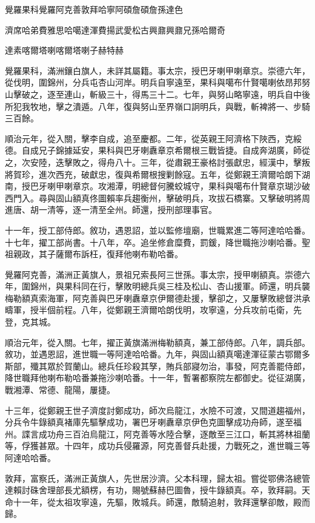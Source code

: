 
\begin{pinyinscope}
覺羅果科覺羅阿克善敦拜哈寧阿碩詹碩詹孫達色

濟席哈弟費雅思哈噶達渾費揚武愛松古興鼐興鼐兄孫哈爾奇

達素喀爾塔喇喀爾塔喇子赫特赫

覺羅果科，滿洲鑲白旗人，未詳其屬籍。事太宗，授巴牙喇甲喇章京。崇德六年，從伐明，圍錦州，分兵屯杏山河岸。明兵自寧遠至，果科與噶布什賢噶喇依昂邦努山擊破之，逐至連山，斬級三十，得馬三十二。七年，與努山略寧遠，明兵自中後所犯我牧地，擊之潰遁。八年，復與努山至界嶺口詗明兵，與戰，斬裨將一、步騎三百餘。

順治元年，從入關，擊李自成，追至慶都。二年，從英親王阿濟格下陜西，克綏德。自成兄子錦據延安，果科與巴牙喇纛章京希爾根三戰皆捷。自成奔湖廣，師從之，次安陸，迭擊敗之，得舟八十。三年，從肅親王豪格討張獻忠，經漢中，擊叛將賀珍，進次西充，破獻忠，復與希爾根搜剿餘寇。五年，從鄭親王濟爾哈朗下湖南，授巴牙喇甲喇章京。攻湘潭，明總督何騰蛟城守，果科與噶布什賢章京瑚沙破西門入。尋與固山額真佟圖賴率兵趨衡州，擊破明兵，攻拔石橋寨。又擊破明將周進唐、胡一清等，逐一清至全州。師還，授刑部理事官。

十一年，授工部侍郎。敘功，遇恩詔，並以監修壇廟，世職累進二等阿達哈哈番。十七年，擢工部尚書。十八年，卒。追坐修倉糜費，罰鍰，降世職拖沙喇哈番。聖祖親政，其子薩爾布訴枉，復拜他喇布勒哈番。

覺羅阿克善，滿洲正黃旗人，景祖兄索長阿三世孫。事太宗，授甲喇額真。崇德六年，圍錦州，與果科同在行，擊敗明總兵吳三桂及松山、杏山援軍。師還，明兵襲梅勒額真索海軍，阿克善與巴牙喇纛章京伊爾德赴援，擊卻之，又屢擊敗總督洪承疇軍，授半個前程。八年，從鄭親王濟爾哈朗伐明，攻寧遠，分兵攻前屯衛，先登，克其城。

順治元年，從入關。七年，擢正黃旗滿洲梅勒額真，兼工部侍郎。八年，調兵部。敘功，並遇恩詔，進世職一等阿達哈哈番。九年，與固山額真噶達渾征蒙古鄂爾多斯部，殲其眾於賀蘭山。總兵任珍殺其孥，賄兵部寢勿治，事發，阿克善罷侍郎，降世職拜他喇布勒哈番兼拖沙喇哈番。十一年，暫署都察院左都御史。從征湖廣，戰湘潭、常德、龍陽，屢捷。

十三年，從鄭親王世子濟度討鄭成功，師次烏龍江，水險不可渡，又間道趨福州，分兵令牛錄額真褚庫先驅擊成功，署巴牙喇纛章京伊色克圖擊成功舟師，遂至福州。諜言成功舟三百泊烏龍江，阿克善等水陸合擊，逐敵至三江口，斬其將林祖蘭等，俘獲甚眾。十四年，成功兵侵羅源，阿克善督兵赴援，力戰死之，進世職三等阿達哈哈番。

敦拜，富察氏，滿洲正黃旗人，先世居沙濟。父本科理，歸太祖。嘗從鄂佛洛總管達賴討硃舍理部長尤額楞，有功，賜號蘇赫巴圖魯，授牛錄額真。卒，敦拜嗣。天命十一年，從太祖攻寧遠，先驅，敗城兵。師還，敵騎追射，敦拜還擊卻敵，殿而歸。


\end{pinyinscope}
